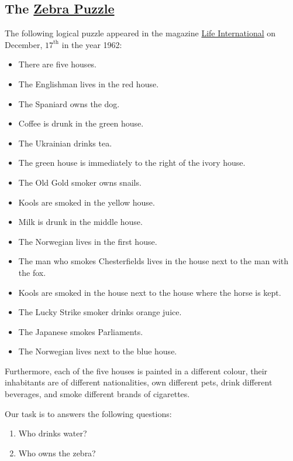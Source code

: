 \subsection{The \href{https://en.wikipedia.org/wiki/Zebra_Puzzle}{Zebra Puzzle} \label{section:zebra}} 
The following logical puzzle appeared in the magazine
\href{https://en.wikipedia.org/wiki/Life_(magazine)}{Life International} 
on  December, $17^\textrm{th}$  in the year 1962:
\begin{itemize}
\item There are five houses.
\item The Englishman lives in the red house.
\item The Spaniard owns the dog.
\item Coffee is drunk in the green house.
\item The Ukrainian drinks tea.
\item The green house is immediately to the right of the ivory house.
\item The Old Gold smoker owns snails.
\item Kools are smoked in the yellow house.
\item Milk is drunk in the middle house.
\item The Norwegian lives in the first house.
\item The man who smokes Chesterfields lives in the house next to the man with the fox.
\item Kools are smoked in the house next to the house where the horse is kept.
\item The Lucky Strike smoker drinks orange juice.
\item The Japanese smokes Parliaments.
\item The Norwegian lives next to the blue house.
\end{itemize}
Furthermore, each of the five houses is painted in a different colour, their
inhabitants are of different nationalities, own different pets, drink different
beverages, and smoke different brands of cigarettes.  

Our task is to answers the following questions:
\begin{enumerate}
\item Who drinks water?
\item Who owns the zebra?
\end{enumerate}

